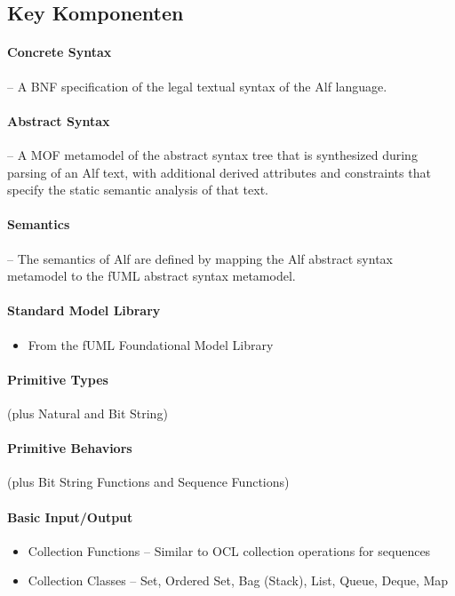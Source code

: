 \subsection{Key Komponenten}

\paragraph{Concrete Syntax} – A BNF specification of the legal textual syntax of the Alf language.

\paragraph{Abstract Syntax} – A MOF metamodel of the abstract syntax tree that is synthesized during parsing of an Alf text, with additional derived attributes and constraints that specify the static semantic analysis of that text.

\paragraph{Semantics} – The semantics of Alf are defined by mapping the Alf abstract syntax metamodel to the fUML abstract syntax metamodel.

\paragraph{Standard Model Library}
\begin{itemize}
\item From the fUML Foundational Model Library
\end{itemize}

\paragraph{Primitive Types} (plus Natural and Bit String)

\paragraph{Primitive Behaviors} (plus Bit String Functions and Sequence Functions)

\paragraph{Basic Input/Output}
\begin{itemize}
\item Collection Functions – Similar to OCL collection operations for sequences
\item Collection Classes – Set, Ordered Set, Bag (Stack), List, Queue, Deque, Map
\end{itemize}

